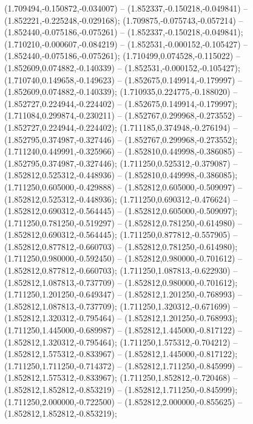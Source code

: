  (1.709494,-0.150872,-0.034007) -- (1.852337,-0.150218,-0.049841) -- (1.852221,-0.225248,-0.029168);
 (1.709875,-0.075743,-0.057214) -- (1.852440,-0.075186,-0.075261) -- (1.852337,-0.150218,-0.049841);
 (1.710210,-0.000607,-0.084219) -- (1.852531,-0.000152,-0.105427) -- (1.852440,-0.075186,-0.075261);
 (1.710499,0.074528,-0.115022) -- (1.852609,0.074882,-0.140339) -- (1.852531,-0.000152,-0.105427);
 (1.710740,0.149658,-0.149623) -- (1.852675,0.149914,-0.179997) -- (1.852609,0.074882,-0.140339);
 (1.710935,0.224775,-0.188020) -- (1.852727,0.224944,-0.224402) -- (1.852675,0.149914,-0.179997);
 (1.711084,0.299874,-0.230211) -- (1.852767,0.299968,-0.273552) -- (1.852727,0.224944,-0.224402);
 (1.711185,0.374948,-0.276194) -- (1.852795,0.374987,-0.327446) -- (1.852767,0.299968,-0.273552);
 (1.711240,0.449991,-0.325966) -- (1.852810,0.449998,-0.386085) -- (1.852795,0.374987,-0.327446);
 (1.711250,0.525312,-0.379087) -- (1.852812,0.525312,-0.448936) -- (1.852810,0.449998,-0.386085);
 (1.711250,0.605000,-0.429888) -- (1.852812,0.605000,-0.509097) -- (1.852812,0.525312,-0.448936);
 (1.711250,0.690312,-0.476624) -- (1.852812,0.690312,-0.564445) -- (1.852812,0.605000,-0.509097);
 (1.711250,0.781250,-0.519297) -- (1.852812,0.781250,-0.614980) -- (1.852812,0.690312,-0.564445);
 (1.711250,0.877812,-0.557905) -- (1.852812,0.877812,-0.660703) -- (1.852812,0.781250,-0.614980);
 (1.711250,0.980000,-0.592450) -- (1.852812,0.980000,-0.701612) -- (1.852812,0.877812,-0.660703);
 (1.711250,1.087813,-0.622930) -- (1.852812,1.087813,-0.737709) -- (1.852812,0.980000,-0.701612);
 (1.711250,1.201250,-0.649347) -- (1.852812,1.201250,-0.768993) -- (1.852812,1.087813,-0.737709);
 (1.711250,1.320312,-0.671699) -- (1.852812,1.320312,-0.795464) -- (1.852812,1.201250,-0.768993);
 (1.711250,1.445000,-0.689987) -- (1.852812,1.445000,-0.817122) -- (1.852812,1.320312,-0.795464);
 (1.711250,1.575312,-0.704212) -- (1.852812,1.575312,-0.833967) -- (1.852812,1.445000,-0.817122);
 (1.711250,1.711250,-0.714372) -- (1.852812,1.711250,-0.845999) -- (1.852812,1.575312,-0.833967);
 (1.711250,1.852812,-0.720468) -- (1.852812,1.852812,-0.853219) -- (1.852812,1.711250,-0.845999);
 (1.711250,2.000000,-0.722500) -- (1.852812,2.000000,-0.855625) -- (1.852812,1.852812,-0.853219);
